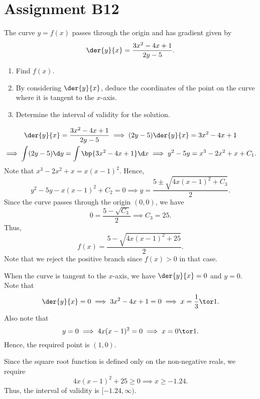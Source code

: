 \section{Assignment B12}

\begin{problem}
    The curve $y = f(x)$ passes through the origin and has gradient given by \[\der{y}{x} = \frac{3x^2-4x+1}{2y-5}.\]
    \begin{enumerate}
        \item Find $f(x)$.
        \item By considering $\der{y}{x}$, deduce the coordinates of the point on the curve where it is tangent to the $x$-axis.
        \item Determine the interval of validity for the solution.
    \end{enumerate}
\end{problem}
\begin{solution}
    \begin{ppart}
        \begin{gather*}
            \der{y}{x} = \frac{3x^2-4x+1}{2y-5} \implies (2y-5)\der{y}{x} = 3x^2 - 4x + 1\\
            \implies \int (2y-5) \d y = \int \bp{3x^2 - 4x + 1} \d x \implies y^2 - 5y = x^3 - 2x^2 + x + C_1.
        \end{gather*}
        Note that $x^3 - 2x^2 + x = x(x-1)^2$. Hence, \[y^2 - 5y - x(x-1)^2 + C_2 = 0 \implies y = \frac{5 \pm \sqrt{4x(x-1)^2 + C_3}}{2}.\] Since the curve passes through the origin $(0, 0)$, we have \[0 = \frac{5 - \sqrt{C_3}}{2} \implies C_3 = 25.\] Thus, \[f(x) = \frac{5-\sqrt{4x(x-1)^2 + 25}}{2}.\] Note that we reject the positive branch since $f(x) > 0$ in that case.
    \end{ppart}
    \begin{ppart}
        When the curve is tangent to the $x$-axis, we have $\der{y}{x} = 0$ and $y = 0$. Note that \[\der{y}{x} = 0 \implies 3x^2 - 4x + 1 = 0 \implies x = \frac13 \tor 1.\] Also note that \[y = 0 \implies 4x(x-1)^2 = 0 \implies x = 0 \tor 1.\] Hence, the required point is $(1, 0)$.
    \end{ppart}
    \begin{ppart}
        Since the square root function is defined only on the non-negative reals, we require \[4x(x-1)^2 + 25 \geq 0 \implies x \geq -1.24.\] Thus, the interval of validity is $[-1.24, \infty)$.
    \end{ppart}
\end{solution}

